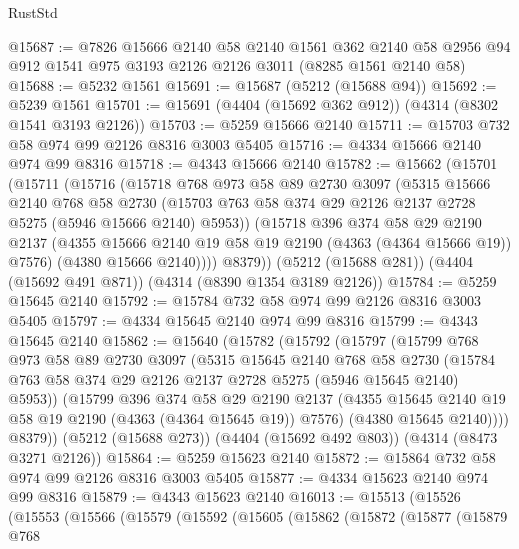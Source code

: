 \begin{lexlean}{RustStd}
\begin{coremodule}
@15687 := @7826
    @15666
    @2140
    @58
    @2140
    @1561
    @362
    @2140
    @58
    @2956
    @94
    @912
    @1541
    @975
    @3193
    @2126
    @2126
    @3011
    (@8285 @1561 @2140 @58)
@15688 := @5232 @1561
@15691 := @15687 (@5212 (@15688 @94))
@15692 := @5239 @1561
@15701 := @15691 (@4404 (@15692 @362 @912)) (@4314 (@8302 @1541 @3193 @2126))
@15703 := @5259 @15666 @2140
@15711 := @15703 @732 @58 @974 @99 @2126 @8316 @3003 @5405
@15716 := @4334 @15666 @2140 @974 @99 @8316
@15718 := @4343 @15666 @2140
@15782 := @15662
    (@15701
      (@15711
        (@15716
          (@15718
            @768
            @973
            @58
            @89
            @2730
            @3097
            (@5315
              @15666
              @2140
              @768
              @58
              @2730
              (@15703 @763 @58 @374 @29 @2126 @2137 @2728 @5275 (@5946 @15666 @2140) @5953))
            (@15718
              @396
              @374
              @58
              @29
              @2190
              @2137
              (@4355 @15666 @2140 @19 @58 @19 @2190 (@4363 (@4364 @15666 @19)) @7576)
              (@4380 @15666 @2140))))
        @8379))
    (@5212 (@15688 @281))
    (@4404 (@15692 @491 @871))
    (@4314 (@8390 @1354 @3189 @2126))
@15784 := @5259 @15645 @2140
@15792 := @15784 @732 @58 @974 @99 @2126 @8316 @3003 @5405
@15797 := @4334 @15645 @2140 @974 @99 @8316
@15799 := @4343 @15645 @2140
@15862 := @15640
    (@15782
      (@15792
        (@15797
          (@15799
            @768
            @973
            @58
            @89
            @2730
            @3097
            (@5315
              @15645
              @2140
              @768
              @58
              @2730
              (@15784 @763 @58 @374 @29 @2126 @2137 @2728 @5275 (@5946 @15645 @2140) @5953))
            (@15799
              @396
              @374
              @58
              @29
              @2190
              @2137
              (@4355 @15645 @2140 @19 @58 @19 @2190 (@4363 (@4364 @15645 @19)) @7576)
              (@4380 @15645 @2140))))
        @8379))
    (@5212 (@15688 @273))
    (@4404 (@15692 @492 @803))
    (@4314 (@8473 @3271 @2126))
@15864 := @5259 @15623 @2140
@15872 := @15864 @732 @58 @974 @99 @2126 @8316 @3003 @5405
@15877 := @4334 @15623 @2140 @974 @99 @8316
@15879 := @4343 @15623 @2140
@16013 := @15513
    (@15526
      (@15553
        (@15566
          (@15579
            (@15592
              (@15605
                (@15862
                  (@15872
                    (@15877
                      (@15879
                        @768

\end{coremodule}
\end{lexlean}
